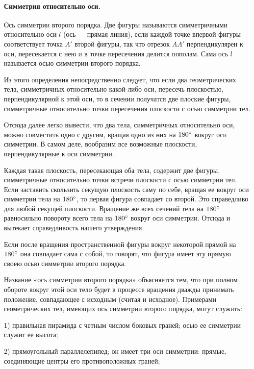 \documentclass[twoside]{book}
\begin{document}
\paragraph{Симметрия относительно оси.}\label{1938/s101}
Ось симметрии второго порядка.
Две фигуры называются симметричными относительно оси $l$ (ось --- прямая линия), если каждой точке впервой фигуры соответствует точка $A'$ второй фигуры, так что отрезок $AA'$ перпендикулярен к оси, пересекается с нею и в точке пересечения делится пополам.
Сама ось $l$ называется осью симметрии второго порядка.

Из этого определения непосредственно следует, что если два геометрических тела, симметричных относительно какой-либо оси, пересечь плоскостью, перпендикулярной к этой оси, то в сечении получатся две плоские фигуры, симметричные относительно точки пересечения плоскости с осью симметрии тел.

Отсюда далее легко вывести, что два тела, симметричных относительно оси, можно совместить одно с другим, вращая одно из них на $180\degree$ вокруг оси симметрии.
В самом деле, вообразим все возможные плоскости, перпендикулярные к оси симметрии.

Каждая такая плоскость, пересекающая оба тела, содержит две фигуры, симметричные относительно точки встречи плоскости с осью симметрии тел.
Если заставить скользить секущую плоскость саму по себе, вращая ее вокруг оси симметрии тела на $180\degree$, то первая фигура совпадает со второй.
Это справедливо для любой секущей плоскости.
Вращение же всех сечений тела на $180\degree$ равносильно повороту всего тела на $180\degree$ вокруг оси симметрии.
Отсюда и вытекает справедливость нашего утверждения.

Если после вращения пространственной фигуры вокруг некоторой прямой на $180\degree$ она совпадает сама с собой, то говорят, что фигура имеет эту прямую своею осью симметрии второго порядка.

Название «ось симметрии второго порядка» объясняется тем, что при полном обороте вокруг этой оси тело будет в процессе вращения дважды принимать положение, совпадающее с исходным (считая и исходное). %
Примерами геометрических тел, имеющих ось симметрии второго порядка, могут служить:

1) правильная пирамида с четным числом боковых граней;
осью ее симметрии служит ее высота;

2) прямоугольный параллелепипед;
он имеет три оси симметрии: прямые, соединяющие центры его противоположных граней;
\end{document}
